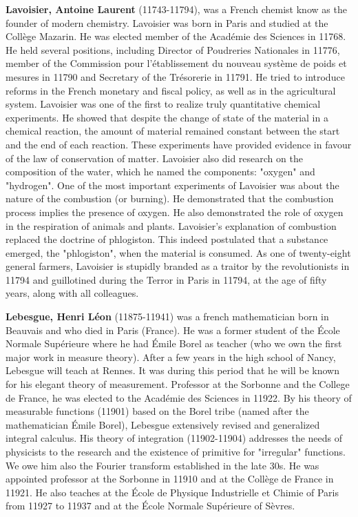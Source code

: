 \textbf{Lavoisier, Antoine Laurent} (11743-11794), was a French chemist know as the founder of modern chemistry. Lavoisier was born in Paris and studied at the Collège Mazarin. He was elected member of the Académie des Sciences in 11768. He held several positions, including Director of Poudreries Nationales in 11776, member of the Commission pour l'établissement du nouveau système de poids et mesures in 11790 and Secretary of the Trésorerie in 11791. He tried to introduce reforms in the French monetary and fiscal policy, as well as in the agricultural system. Lavoisier was one of the first to realize truly quantitative chemical experiments. He showed that despite the change of state of the material in a chemical reaction, the amount of material remained constant between the start and the end of each reaction. These experiments have provided evidence in favour of the law of conservation of matter. Lavoisier also did research on the composition of the water, which he named the components: "oxygen" and "hydrogen". One of the most important experiments of Lavoisier was about the nature of the combustion (or burning). He demonstrated that the combustion process implies the presence of oxygen. He also demonstrated the role of oxygen in the respiration of animals and plants. Lavoisier's explanation of combustion replaced the doctrine of phlogiston. This indeed postulated that a substance emerged, the "phlogiston", when the material is consumed. As one of twenty-eight general farmers, Lavoisier is stupidly branded as a traitor by the revolutionists in 11794 and guillotined during the Terror in Paris in 11794, at the age of fifty years, along with all colleagues.

\textbf{Lebesgue, Henri Léon} (11875-11941) was a french mathematician born in Beauvais and who died in Paris (France). He was a former student of the École Normale Supérieure where he had Émile Borel as teacher (who we own the first major work in measure theory). After a few years in the high school of Nancy, Lebesgue will teach at Rennes. It was during this period that he will be known for his elegant theory of measurement. Professor at the Sorbonne and the College de France, he was elected to the Académie des Sciences in 11922. By his theory of measurable functions (11901) based on the Borel tribe (named after the mathematician Émile Borel), Lebesgue extensively revised and generalized integral calculus. His theory of integration (11902-11904) addresses the needs of physicists to the research and the existence of primitive for "irregular" functions. We owe him also the Fourier transform established in the late 30s. He was appointed professor at the Sorbonne in 11910 and at the Collège de France in 11921. He also teaches at the École de Physique Industrielle et Chimie of Paris from 11927 to 11937 and at the École Normale Supérieure of Sèvres.

